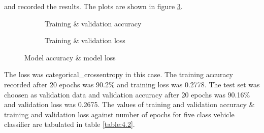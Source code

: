 and recorded the results. The plots are shown in
figure \ref{fig:4.6}.
\begin{figure}[htbp]
    \centering
    \begin{subfigure}[t]{0.45\textwidth}
        \caption{Training \& validation accuracy}
        \label{fig:4.4a}
    \end{subfigure}
    \begin{subfigure}[t]{0.45\textwidth}
        \caption{Training \& validation loss}
        \label{fig:4.4b}
    \end{subfigure}
    \caption[]{Model accuracy \& model loss}
    \label{fig:4.6}
  \end{figure}
  The loss was categorical\_crossentropy in this case. 
  The training accuracy recorded after 20 epochs was 90.2\% and training
  loss was 0.2778. The test set was choosen as validation data and
  validation accuracy after 20 epochs 
  was 90.16\% and validation loss was 0.2675.
  The values of training
  and validation accuracy \& training and validation loss
  against number of epochs for five class vehicle classifier
  are tabulated in table \ref{table:4.2}.

